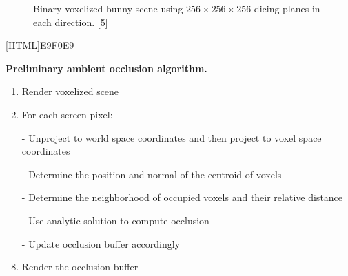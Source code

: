 \documentclass{amsart}
\begin{document}
\begin{center}
\setlength\fboxsep{0pt}
\setlength\fboxrule{0.5pt}
\begin{figure}[htb]
\caption{Binary voxelized bunny scene using $256 \times 256 \times 256$ dicing planes in each direction. [5]}
\end{figure}
\end{center}

[HTML]{E9F0E9}{\parbox{\textwidth}{
\noindent \textbf{Preliminary ambient occlusion algorithm.}
\begin{enumerate}[nolistsep]
\item Render voxelized scene 
\item For each screen pixel:
		\item[-] Unproject to world space coordinates and then project to voxel space coordinates
		\item[-] Determine the position and normal of the centroid of voxels
		\item[-] Determine the neighborhood of occupied voxels and their relative distance
		\item[-] Use analytic solution to compute occlusion
		\item[-] Update occlusion buffer accordingly
\item Render the occlusion buffer
\end{enumerate}}}

\indent{}

\vspace{4mm}
\end{document}
